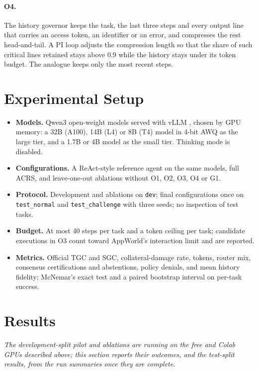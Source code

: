 \paragraph{O4.} The history governor keeps the task, the last three steps and every output line that
carries an access token, an identifier or an error, and compresses the rest head-and-tail. A PI loop
adjusts the compression length so that the share of such critical lines retained stays above 0.9 while
the history stays under its token budget. The analogue keeps only the most recent steps.

\section{Experimental Setup}
\label{sec:aw-setup}

\begin{itemize}[leftmargin=*]
\item \textbf{Models.} Qwen3 open-weight models \citep{yang2025qwen3} served with vLLM
\citep{kwon2023vllm}, chosen by GPU memory: a 32B (A100), 14B (L4) or 8B (T4) model in 4-bit AWQ as the
large tier, and a 1.7B or 4B model as the small tier. Thinking mode is disabled.
\item \textbf{Configurations.} A ReAct-style reference agent on the same models, full ACRS, and
leave-one-out ablations without O1, O2, O3, O4 or G1.
\item \textbf{Protocol.} Development and ablations on \texttt{dev}; final configurations once on
\texttt{test\_normal} and \texttt{test\_challenge} with three seeds; no inspection of test tasks.
\item \textbf{Budget.} At most 40 steps per task and a token ceiling per task; candidate executions in O3
count toward AppWorld's interaction limit and are reported.
\item \textbf{Metrics.} Official TGC and SGC, collateral-damage rate, tokens, router mix, consensus
certifications and abstentions, policy denials, and mean history fidelity; McNemar's exact test and a
paired bootstrap interval on per-task success.
\end{itemize}

\section{Results}
\label{sec:aw-results}

\textit{The development-split pilot and ablations are running on the free and Colab GPUs described above;
this section reports their outcomes, and the test-split results, from the run summaries once they are
complete.}

